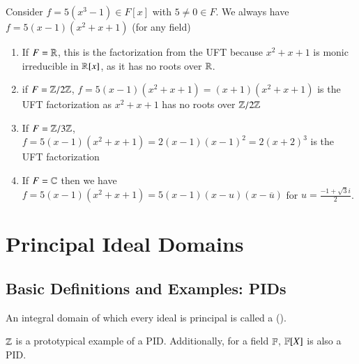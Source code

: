 \documentclass[12pt, a4paper, twoside, openright, titlepage]{book}
\begin{document}
\begin{eg}{}{}
        Consider $f = 5(x^3-1) \in F[x]$ with $5 \neq 0 \in F$. We always have $f = 5(x-1)(x^2+x+1)$ (for any field) \begin{enumerate}
                \item If $F = \mathbb R$, this is the factorization from the UFT because $x^2+x+1$ is monic irreducible in $\mathbb R[x]$, as it has no roots over $\mathbb R$.
                \item if $F = \mathbb Z/2\mathbb Z$, $f = 5(x-1)(x^2+x+1) = (x+1)(x^2+x+1)$ is the UFT factorization as $x^2+x+1$ has no roots over $\mathbb Z/2\mathbb Z$
                \item If $F = \mathbb Z/3\mathbb Z$, $f = 5(x-1)(x^2+x+1) = 2(x-1)(x-1)^2 = 2(x+2)^3$ is the UFT factorization
                \item If $F = \mathbb C$ then we have $f = 5(x-1)(x^2+x+1) = 5(x-1)(x-u)(x-\overline{u})$ for $u = \frac{-1+\sqrt{3}i}{2}$.
        \end{enumerate}
\end{eg}



\chapter{\textsection\textsection Principal Ideal Domains}

\section{\textsection Basic Definitions and Examples: PIDs}

\begin{defn}{}{}
    An integral domain of which every ideal is principal is called a  ().
\end{defn}

\begin{rmk}{}{}
    $\mathbb Z$ is a prototypical example of a PID. Additionally, for a field $\mathbb F$, $\mathbb F[X]$ is also a PID.
\end{rmk}
\end{document}
